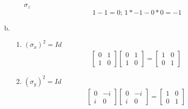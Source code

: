 \documentclass[12pt]{article}
\begin{document}
\begin{enumerate}[(a)]
\begin{enumerate}
			\item [$ \sigma_z $]
			\[
			\	1-1=0;\, 1*-1-0*0=-1
			\]
		\end{enumerate}
	
	\item \,
		\begin{enumerate}[]
			\item $ \left(\sigma_x\right)^2 = Id $
			\begin{align*}
				\begin{bmatrix}
					0 & 1\\
					1 & 0
				\end{bmatrix}
				\begin{bmatrix}
					0 & 1\\
					1 & 0
				\end{bmatrix}
				=
				\begin{bmatrix}
					1 & 0\\
					0 & 1
				\end{bmatrix}
			\end{align*}
			
			\item $ \left(\sigma_y\right)^2 = Id $
			\begin{align*}
				\begin{bmatrix}
					0 & -i\\
					i & 0
				\end{bmatrix}
				\begin{bmatrix}
					0 & -i\\
					i & 0
				\end{bmatrix}
				=
				\begin{bmatrix}
					1 & 0\\
					0 & 1
				\end{bmatrix}
			\end{align*}
			

\end{enumerate}
\end{enumerate}
\end{document}
